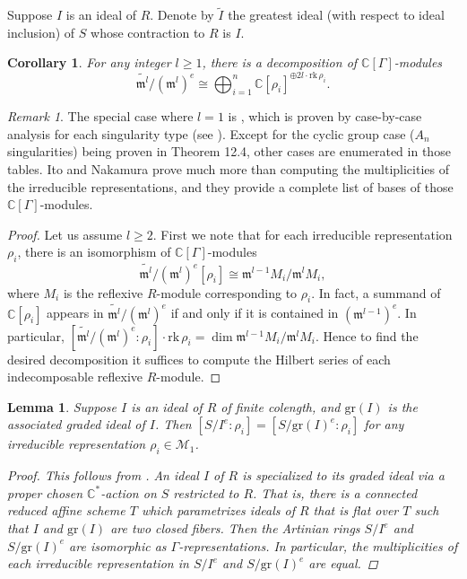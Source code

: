 \documentclass{amsart}[12pt]
\newtheorem{lemma}[theorem]{Lemma}
\newtheorem{cor}[theorem]{Corollary}
\theoremstyle{definition}
\theoremstyle{remark}
\newtheorem{rmk}[theorem]{Remark}
\numberwithin{equation}{section}
\begin{document}
Suppose $I$ is an ideal of $R$. Denote by $\tilde{I}$ the greatest ideal (with respect to ideal inclusion) of $S$ whose contraction to $R$ is $I$.
\begin{cor}\label{maximalideal}
For any integer $l \geq 1$, there is a decomposition of $\mathbb{C}[\Gamma]$-modules
\[
\widetilde{\mathfrak{m}^l}/(\mathfrak{m}^l)^e \cong \bigoplus_{i = 1}^n \mathbb{C}[\rho_i]^{\oplus 2l \cdot \mathrm{rk}\, \rho_i}.
\]
\end{cor}
\begin{rmk}
The special case where $l = 1$ is \cite[Theorem 10.5.1]{IN99}, which is proven by case-by-case analysis for each singularity type (see \cite[Theorem 12.4, Table 7, 8, 10, 13, 14, 17, 18]{IN99}). Except for the cyclic group case ($A_n$ singularities) being proven in Theorem 12.4, other cases are enumerated in those tables. Ito and Nakamura prove much more than computing the multiplicities of the irreducible representations, and they provide a complete list of bases of those $\mathbb{C}[\Gamma]$-modules.
\end{rmk}
\begin{proof}
Let us assume $l \geq 2$. First we note that for each irreducible representation $\rho_i$, there is an isomorphism of $\mathbb{C}[\Gamma]$-modules 
\[
\widetilde{\mathfrak{m}^l}/(\mathfrak{m}^l)^e[\rho_i] \cong \mathfrak{m}^{l - 1} M_i / \mathfrak{m}^l M_i,
\]
where $M_i$ is the reflexive $R$-module corresponding to $\rho_i$. In fact, a summand of $\mathbb{C}[\rho_i]$ appears in $\widetilde{\mathfrak{m}^l}/(\mathfrak{m}^l)^e$ if and only if it is contained in $(\mathfrak{m}^{l - 1})^e$. In particular, $[\widetilde{\mathfrak{m}^l}/(\mathfrak{m}^l)^e : \rho_i] \cdot \mathrm{rk} \, \rho_i = \dim \mathfrak{m}^{l - 1} M_i / \mathfrak{m}^l M_i$. Hence to find the desired decomposition it suffices to compute the Hilbert series of each indecomposable reflexive $R$-module. 
\end{proof}


\begin{lemma}\label{homog}
Suppose $I$ is an ideal of $R$ of finite colength, and $\mathrm{gr}(I)$ is the associated graded ideal of $I$. Then $[S/I^e : \rho_i] = [S/\mathrm{gr}(I)^e : \rho_i]$ for any irreducible representation $\rho_i \in \mathcal{M}_1$.
\begin{proof}
This follows from \cite[Lemma 9.4]{IN99}. An ideal $I$ of $R$ is specialized to its graded ideal via a proper chosen $\mathbb{C}^{*}$-action on $S$ restricted to $R$. That is, there is a connected reduced affine scheme $T$ which parametrizes ideals of $R$ that is flat over $T$ such that $I$ and $\mathrm{gr}(I)$ are two closed fibers. Then the Artinian rings $S/I^e$ and $S/\mathrm{gr}(I)^e$ are isomorphic as $\Gamma$-representations. In particular, the multiplicities of each irreducible representation in $S/I^e$ and $S/\mathrm{gr}(I)^e$ are equal. 
\end{proof}
\end{lemma}
\end{document}
